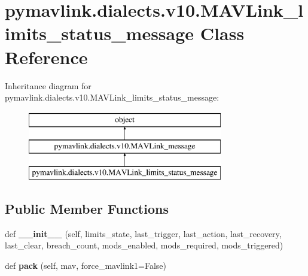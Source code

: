 \hypertarget{classpymavlink_1_1dialects_1_1v10_1_1MAVLink__limits__status__message}{}\section{pymavlink.\+dialects.\+v10.\+M\+A\+V\+Link\+\_\+limits\+\_\+status\+\_\+message Class Reference}
\label{classpymavlink_1_1dialects_1_1v10_1_1MAVLink__limits__status__message}
Inheritance diagram for pymavlink.\+dialects.\+v10.\+M\+A\+V\+Link\+\_\+limits\+\_\+status\+\_\+message\+:\begin{figure}[H]
\begin{center}
\leavevmode
\includegraphics[height=3.000000cm]{classpymavlink_1_1dialects_1_1v10_1_1MAVLink__limits__status__message}
\end{center}
\end{figure}
\subsection*{Public Member Functions}
\begin{DoxyCompactItemize}
\item 
\mbox{\label{classpymavlink_1_1dialects_1_1v10_1_1MAVLink__limits__status__message_ad73b12d2e3c0ba3f4a6a52084cf701a8}} 
def {\bfseries \+\_\+\+\_\+init\+\_\+\+\_\+} (self, limits\+\_\+state, last\+\_\+trigger, last\+\_\+action, last\+\_\+recovery, last\+\_\+clear, breach\+\_\+count, mods\+\_\+enabled, mods\+\_\+required, mods\+\_\+triggered)
\item 
\mbox{\label{classpymavlink_1_1dialects_1_1v10_1_1MAVLink__limits__status__message_a0abacc765f6b4ea2de383eb97bae3ad4}} 
def {\bfseries pack} (self, mav, force\+\_\+mavlink1=False)
\end{DoxyCompactItemize}
